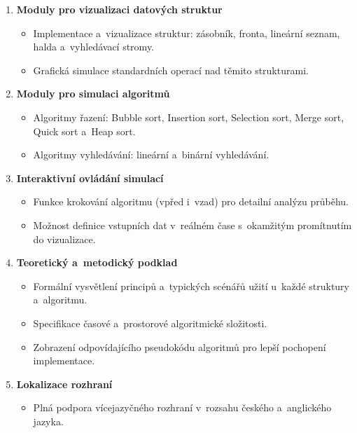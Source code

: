 \begin{enumerate}
    \item \textbf{Moduly pro vizualizaci datových struktur}
          \begin{itemize}[nosep]
              \item Implementace a~vizualizace struktur: zásobník, fronta, lineární seznam, halda a~vyhledávací stromy.
              \item Grafická simulace standardních operací nad těmito strukturami.
          \end{itemize}

    \item \textbf{Moduly pro simulaci algoritmů}
          \begin{itemize}[nosep]
              \item Algoritmy řazení: Bubble sort, Insertion sort, Selection sort, Merge sort, Quick sort a~Heap sort.
              \item Algoritmy vyhledávání: lineární a~binární vyhledávání.
          \end{itemize}

    \item \textbf{Interaktivní ovládání simulací}
          \begin{itemize}[nosep]
              \item Funkce krokování algoritmu (vpřed i~vzad) pro detailní analýzu průběhu.
              \item Možnost definice vstupních dat v~reálném čase s~okamžitým promítnutím do vizualizace.
          \end{itemize}

    \item \textbf{Teoretický a~metodický podklad}
          \begin{itemize}[nosep]
              \item Formální vysvětlení principů a~typických scénářů užití u~každé struktury a~algoritmu.
              \item Specifikace časové a~prostorové algoritmické složitosti.
              \item Zobrazení odpovídajícího pseudokódu algoritmů pro lepší pochopení implementace.
          \end{itemize}

    \item \textbf{Lokalizace rozhraní}
          \begin{itemize}[nosep]
              \item Plná podpora vícejazyčného rozhraní v~rozsahu českého a~anglického jazyka.
          \end{itemize}


\end{enumerate}
